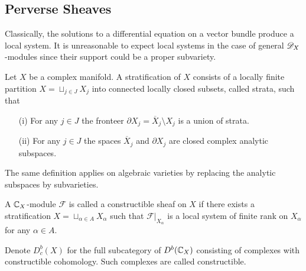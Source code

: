 \subsection{Perverse Sheaves}
  Classically, the solutions to a differential equation on a vector bundle produce a local system.
  It is unreasonable to expect local systems in the case of general $\mathscr{D}_X$-modules since their support could be a proper subvariety.
  \begin{definition}
    Let $X$ be a complex manifold. A stratification of $X$ consists of a locally finite partition $X  = \sqcup_{j\in J} X_j$ into connected locally closed subsets, called strata, such that
    \begin{enumerate}
      \item[(i)] For any $j\in J$ the fronteer $\partial X_j = \overline{X}_j\setminus X_j$ is a union of strata.
      \item[(ii)] For any $j\in J$ the spaces $\overline{X}_j$ and $\partial X_j$ are closed complex analytic subspaces.
    \end{enumerate}
  \end{definition}
  The same definition applies on algebraic varieties by replacing the analytic subspaces by subvarieties.
  \begin{definition}
     A $\mathbb{C}_X$-module $\mathcal{F}$ is called a constructible sheaf on $X$ if there exists a stratification $X = \sqcup_{\alpha\in A}X_\alpha$ such that $\mathcal{F}\vert_{X_\alpha}$ is a local system of finite rank on $X_\alpha$ for any $\alpha \in A$.
  \end{definition}
  Denote $D^b_c(X)$ for the full subcategory of $D^b(\mathbb{C}_X)$ consisting of complexes with constructible cohomology.
  Such complexes are called constructible.

